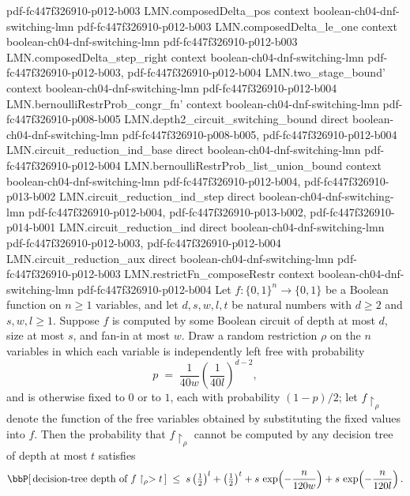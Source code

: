 \begin{theorem}
  {pdf-fc447f326910-p012-b003}
\proofstep
  {LMN.composedDelta_pos}
  {context}
  {boolean-ch04-dnf-switching-lmn}
  {pdf-fc447f326910-p012-b003}
\proofstep
  {LMN.composedDelta_le_one}
  {context}
  {boolean-ch04-dnf-switching-lmn}
  {pdf-fc447f326910-p012-b003}
\proofstep
  {LMN.composedDelta_step_right}
  {context}
  {boolean-ch04-dnf-switching-lmn}
  {pdf-fc447f326910-p012-b003,
    pdf-fc447f326910-p012-b004}
\proofstep
  {LMN.two_stage_bound'}
  {context}
  {boolean-ch04-dnf-switching-lmn}
  {pdf-fc447f326910-p012-b004}
\proofstep
  {LMN.bernoulliRestrProb_congr_fn'}
  {context}
  {boolean-ch04-dnf-switching-lmn}
  {pdf-fc447f326910-p008-b005}
\proofstep
  {LMN.depth2_circuit_switching_bound}
  {direct}
  {boolean-ch04-dnf-switching-lmn}
  {pdf-fc447f326910-p008-b005,
    pdf-fc447f326910-p012-b004}
\proofstep
  {LMN.circuit_reduction_ind_base}
  {direct}
  {boolean-ch04-dnf-switching-lmn}
  {pdf-fc447f326910-p012-b004}
\proofstep
  {LMN.bernoulliRestrProb_list_union_bound}
  {context}
  {boolean-ch04-dnf-switching-lmn}
  {pdf-fc447f326910-p012-b004,
    pdf-fc447f326910-p013-b002}
\proofstep
  {LMN.circuit_reduction_ind_step}
  {direct}
  {boolean-ch04-dnf-switching-lmn}
  {pdf-fc447f326910-p012-b004,
    pdf-fc447f326910-p013-b002,
    pdf-fc447f326910-p014-b001}
\proofstep
  {LMN.circuit_reduction_ind}
  {direct}
  {boolean-ch04-dnf-switching-lmn}
  {pdf-fc447f326910-p012-b003,
    pdf-fc447f326910-p012-b004}
\proofstep
  {LMN.circuit_reduction_aux}
  {direct}
  {boolean-ch04-dnf-switching-lmn}
  {pdf-fc447f326910-p012-b003}
\proofstep
  {LMN.restrictFn_composeRestr}
  {context}
  {boolean-ch04-dnf-switching-lmn}
  {pdf-fc447f326910-p012-b004}
Let $f:\{0,1\}^n\to\{0,1\}$ be a Boolean function on $n\ge 1$ variables, and let
$d,s,w,l,t$ be natural numbers with $d\ge 2$ and $s,w,l\ge 1$. Suppose $f$ is computed
by some Boolean circuit of depth at most $d$, size at most $s$, and fan-in at most $w$.
Draw a random restriction $\rho$ on the $n$ variables in which each variable is
independently left free with probability
\[
  p \;=\; \frac{1}{40w}\left(\frac{1}{40l}\right)^{d-2},
\]
and is otherwise fixed to $0$ or to $1$, each with probability $(1-p)/2$; let
$f\restriction_\rho$ denote the function of the free variables obtained by substituting
the fixed values into $f$. Then the probability that $f\restriction_\rho$ cannot be
computed by any decision tree of depth at most $t$ satisfies
\[
  \bbP\!\left[\,\text{decision-tree depth of } f\restriction_\rho > t\,\right]
  \;\le\; s\left(\tfrac12\right)^{l} + \left(\tfrac12\right)^{t}
  + s\,\exp\!\left(-\frac{n}{120w}\right) + s\,\exp\!\left(-\frac{n}{120l}\right).
\]
\end{theorem}
